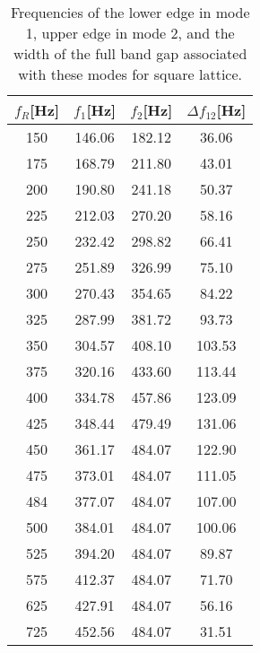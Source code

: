 \documentclass{article}
\begin{document}
\begin{table}[htb]
\centering
\caption{Frequencies of the lower edge in mode 1, upper edge in mode 2, and the width of the full band gap associated with these modes for square lattice.}
\label{tab100}
\begin{tabular}{cccc}
\hline
$f_R$[Hz] & $f_1$[Hz] & $f_2$[Hz] & $\Delta f _{12}$[Hz] \\ \hline
150 & 146.06 & 182.12 & 36.06 \\ \hline
175 & 168.79 & 211.80 & 43.01 \\ \hline
200 & 190.80 & 241.18 & 50.37 \\ \hline
225 & 212.03 & 270.20 & 58.16 \\ \hline
250 & 232.42 & 298.82 & 66.41 \\ \hline
275 & 251.89 & 326.99 & 75.10 \\ \hline
300 & 270.43 & 354.65 & 84.22 \\ \hline
325 & 287.99 & 381.72 & 93.73 \\ \hline
350 & 304.57 & 408.10 & 103.53 \\ \hline
375 & 320.16 & 433.60 & 113.44 \\ \hline
400 & 334.78 & 457.86 & 123.09 \\ \hline
425 & 348.44 & 479.49 & 131.06 \\ \hline
450 & 361.17 & 484.07 & 122.90 \\ \hline
475 & 373.01 & 484.07 & 111.05 \\ \hline
484 & 377.07 & 484.07 & 107.00 \\ \hline
500 & 384.01 & 484.07 & 100.06 \\ \hline
525 & 394.20 & 484.07 & 89.87 \\ \hline
575 & 412.37 & 484.07 & 71.70 \\ \hline
625 & 427.91 & 484.07 & 56.16 \\ \hline
725 & 452.56 & 484.07 & 31.51 \\ \hline
\end{tabular}
\end{table}
\end{document}
